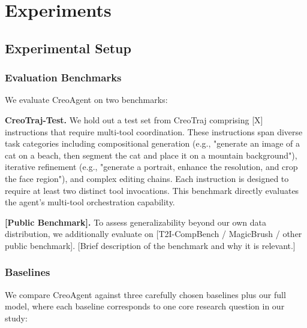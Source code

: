 \documentclass[11pt]{article}
\begin{document}
\section{Experiments}

\subsection{Experimental Setup}

\subsubsection{Evaluation Benchmarks}

We evaluate CreoAgent on two benchmarks:

\textbf{CreoTraj-Test.} We hold out a test set from CreoTraj comprising [X] instructions that require multi-tool coordination. These instructions span diverse task categories including compositional generation (e.g., "generate an image of a cat on a beach, then segment the cat and place it on a mountain background"), iterative refinement (e.g., "generate a portrait, enhance the resolution, and crop the face region"), and complex editing chains. Each instruction is designed to require at least two distinct tool invocations. This benchmark directly evaluates the agent's multi-tool orchestration capability.

\textbf{[Public Benchmark].} To assess generalizability beyond our own data distribution, we additionally evaluate on [T2I-CompBench / MagicBrush / other public benchmark]. [Brief description of the benchmark and why it is relevant.]

\subsubsection{Baselines}

We compare CreoAgent against three carefully chosen baselines plus our full model, where each baseline corresponds to one core research question in our study:
\end{document}
